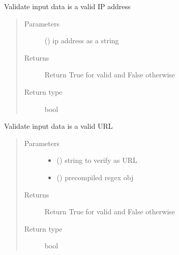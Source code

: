 \documentclass[letterpaper,10pt,english]{sphinxmanual}
\begin{document}

\begin{fulllineitems}
\label{\detokenize{utils:bloxone.utils.validate_ip}}
\sphinxAtStartPar
Validate input data is a valid IP address
\begin{quote}\begin{description}
\item[{Parameters}] \leavevmode
\sphinxAtStartPar
{} () \textendash{} ip address as a string

\item[{Returns}] \leavevmode
\sphinxAtStartPar
Return True for valid and False otherwise

\item[{Return type}] \leavevmode
\sphinxAtStartPar
bool

\end{description}\end{quote}

\end{fulllineitems}


\begin{fulllineitems}
\label{\detokenize{utils:bloxone.utils.validate_url}}
\sphinxAtStartPar
Validate input data is a valid URL
\begin{quote}\begin{description}
\item[{Parameters}] \leavevmode\begin{itemize}
\item {} 
\sphinxAtStartPar
{} () \textendash{} string to verify as URL

\item {} 
\sphinxAtStartPar
{} () \textendash{} pre\sphinxhyphen{}compiled regex obj

\end{itemize}

\item[{Returns}] \leavevmode
\sphinxAtStartPar
Return True for valid and False otherwise

\item[{Return type}] \leavevmode
\sphinxAtStartPar
bool

\end{description}\end{quote}

\end{fulllineitems}
\end{document}

